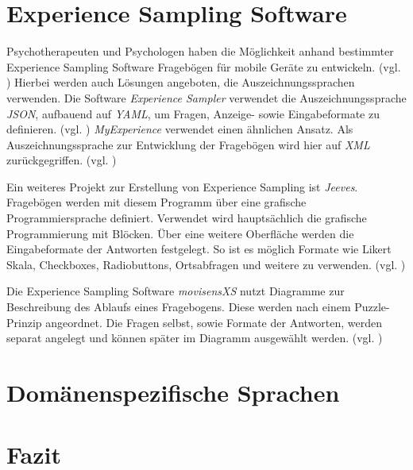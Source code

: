 
\section{Experience Sampling Software}

Psychotherapeuten und Psychologen haben die Möglichkeit anhand bestimmter Experience Sampling Software Fragebögen für mobile Geräte zu entwickeln. (vgl. \cite{OSFSabri6:online}) Hierbei werden auch Lösungen angeboten, die  Auszeichnungssprachen verwenden. Die Software \emph{Experience Sampler} verwendet die Auszeichnungssprache \emph{JSON}, aufbauend auf \emph{YAML}, um Fragen, Anzeige- sowie Eingabeformate zu definieren. (vgl. \cite{OSFSabri6:online}) \emph{MyExperience} verwendet einen ähnlichen Ansatz. Als Auszeichnungssprache zur Entwicklung der Fragebögen wird hier auf \emph{XML} zurückgegriffen. (vgl. \cite{theMyExp48:online})

Ein weiteres Projekt zur Erstellung von Experience Sampling ist \emph{Jeeves}. Fragebögen werden mit diesem Programm über eine grafische Programmiersprache definiert. Verwendet wird hauptsächlich die grafische Programmierung mit Blöcken. Über eine weitere Oberfläche werden die Eingabeformate der Antworten festgelegt. So ist es möglich Formate wie Likert Skala, Checkboxes, Radiobuttons, Ortsabfragen und weitere zu verwenden. (vgl. \cite{Rough2017})

Die Experience Sampling Software \emph{movisensXS} nutzt Diagramme zur Beschreibung des Ablaufs eines Fragebogens. Diese werden nach einem Puzzle-Prinzip angeordnet. Die Fragen selbst, sowie Formate der Antworten, werden separat angelegt und können später im Diagramm ausgewählt werden. (vgl. \cite{movisens59:online})


\section{Domänenspezifische Sprachen}



\section{Fazit}

